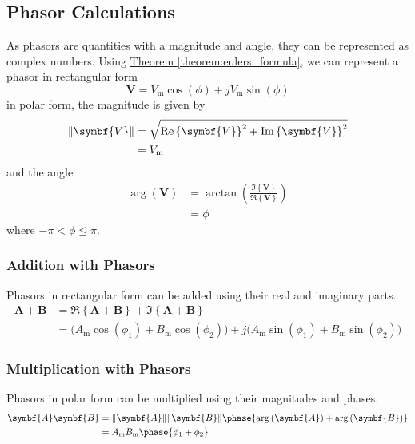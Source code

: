 \documentclass{article}
\begin{document}
\subsection{Phasor Calculations}
As phasors are quantities with a magnitude and angle, they can be represented as complex numbers. 
Using \hyperref[theorem:eulers_formula]{Theorem \ref{theorem:eulers_formula}}, we can represent a phasor in rectangular form
\begin{equation*}
    \symbf{V} = V_{\mathrm{m}} \cos{\left( \phi \right)} + j V_{\mathrm{m}} \sin{\left( \phi \right)}
\end{equation*}
in polar form, the magnitude is given by
\begin{align*}
    \norm{\symbf{V}} &= \sqrt{\Re\left\{ \symbf{V} \right\}^2 + \Im\left\{ \symbf{V} \right\}^2} \\
    &= V_{\mathrm{m}}
\end{align*}
and the angle
\begin{align*}
    \arg{\left( \symbf{V} \right)} &= \arctan{\left( \frac{\Im\left\{ \symbf{V} \right\}}{\Re\left\{ \symbf{V} \right\}} \right)} \\
    &= \phi 
\end{align*}
where $-\pi < \phi \leq \pi$.
\subsubsection{Addition with Phasors}
Phasors in rectangular form can be added using their real and imaginary parts.
\begin{align*}
    \symbf{A} + \symbf{B} &= \Re\left\{ \symbf{A} + \symbf{B} \right\} + \Im\left\{ \symbf{A} + \symbf{B} \right\} \\
    &= \bigl( A_{\mathrm{m}}\cos{\left( \phi_1 \right)} + B_{\mathrm{m}}\cos{\left( \phi_2 \right)} \bigr) + j\bigl( A_{\mathrm{m}}\sin{\left( \phi_1 \right)} + B_{\mathrm{m}}\sin{\left( \phi_2 \right)} \bigr)
\end{align*}
\subsubsection{Multiplication with Phasors}
Phasors in polar form can be multiplied using their magnitudes and phases.
\begin{align*}
    \symbf{A} \symbf{B} &= \norm{\symbf{A}} \norm{\symbf{B}} \phase{\arg{\left( \symbf{A} \right)} + \arg{\left( \symbf{B} \right)}} \\
    &= A_{\mathrm{m}} B_{\mathrm{m}} \phase{\phi_1 + \phi_2}
\end{align*}
\end{document}
